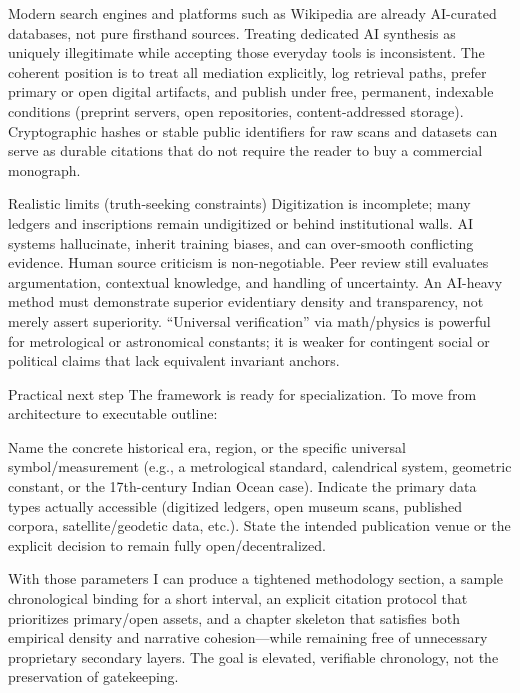 Modern search engines and platforms such as Wikipedia are already AI-curated databases, not pure firsthand sources. Treating dedicated AI synthesis as uniquely illegitimate while accepting those everyday tools is inconsistent. The coherent position is to treat all mediation explicitly, log retrieval paths, prefer primary or open digital artifacts, and publish under free, permanent, indexable conditions (preprint servers, open repositories, content-addressed storage). Cryptographic hashes or stable public identifiers for raw scans and datasets can serve as durable citations that do not require the reader to buy a commercial monograph.

Realistic limits (truth-seeking constraints)
Digitization is incomplete; many ledgers and inscriptions remain undigitized or behind institutional walls.
AI systems hallucinate, inherit training biases, and can over-smooth conflicting evidence. Human source criticism is non-negotiable.
Peer review still evaluates argumentation, contextual knowledge, and handling of uncertainty. An AI-heavy method must demonstrate superior evidentiary density and transparency, not merely assert superiority.
“Universal verification” via math/physics is powerful for metrological or astronomical constants; it is weaker for contingent social or political claims that lack equivalent invariant anchors.

Practical next step
The framework is ready for specialization. To move from architecture to executable outline:

Name the concrete historical era, region, or the specific universal symbol/measurement (e.g., a metrological standard, calendrical system, geometric constant, or the 17th-century Indian Ocean case).
Indicate the primary data types actually accessible (digitized ledgers, open museum scans, published corpora, satellite/geodetic data, etc.).
State the intended publication venue or the explicit decision to remain fully open/decentralized.

With those parameters I can produce a tightened methodology section, a sample chronological binding for a short interval, an explicit citation protocol that prioritizes primary/open assets, and a chapter skeleton that satisfies both empirical density and narrative cohesion—while remaining free of unnecessary proprietary secondary layers. The goal is elevated, verifiable chronology, not the preservation of gatekeeping.
